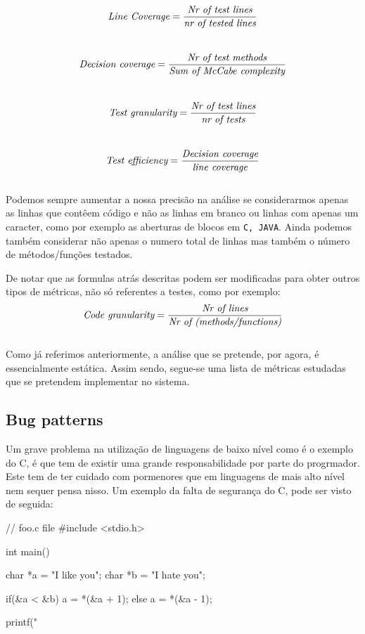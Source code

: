 \[ \emph{\text{Line Coverage}} = \frac{\emph{\text{Nr of test lines}}}{\emph{\text{nr of tested lines}}} \] \\

\[ \emph{\text{Decision coverage}} = \frac{\emph{\text{Nr of test methods}}}{\emph{\text{Sum of McCabe complexity}}} \] \\

\[ \emph{\text{Test granularity}} = \frac{\emph{\text{Nr of test lines}}}{\emph{\text{nr of tests}}} \] \\

\[\emph{\text{Test efficiency}} = \frac{\emph{\text{Decision coverage}}}{\emph{\text{line coverage}}} \] \\


Podemos sempre aumentar a nossa precisão na análise se considerarmos apenas as linhas que contêem código e não as linhas em branco ou linhas com apenas um caracter, 
como por exemplo as aberturas de blocos em \texttt{C, JAVA}.
Ainda podemos também considerar não apenas o numero total de linhas mas também o número de métodos/funções testados.

De notar que as formulas atrás descritas podem ser modificadas para obter outros tipos de métricas, não só referentes a testes, como por exemplo:\\

\[\emph{\text{Code granularity}} = \frac{\emph{\text{Nr of lines}}}{\emph{\text{Nr of (methods/functions)}}} \] \\

Como já referimos anteriormente, a análise que se pretende, por agora, é essencialmente estática. Assim sendo, segue-se uma lista de métricas estudadas que se pretendem 
implementar no sistema.


\subsection{Bug patterns}
Um grave problema na utilização de linguagens de baixo nível como é o exemplo do C, é 
que tem de existir uma grande responsabilidade por parte do progrmador. 
Este tem de ter cuidado com pormenores que em linguagens de mais alto nível nem sequer pensa nisso.
Um exemplo da falta de segurança do C, pode ser visto de seguida:

\begin{code_files}
// foo.c file
#include <stdio.h>

int main() {
    char *a = "I like you";
    char *b = "I hate you";

    if(&a < &b) a = *(&a + 1);
    else        a = *(&a - 1); 

    printf("%
}
\end{code_files}

